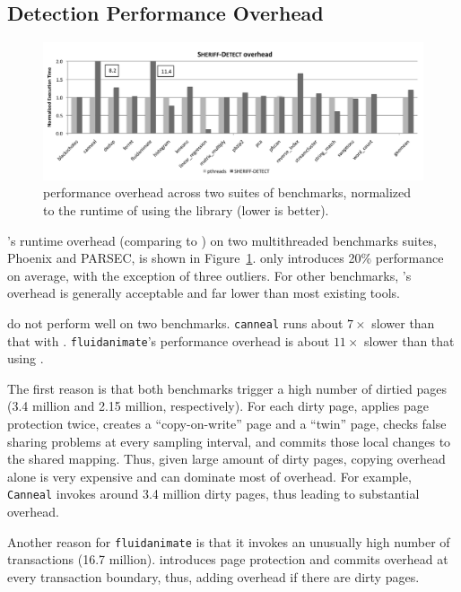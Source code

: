 \subsection{Detection Performance Overhead}
\label{sec:results-runtime-overhead}

\begin{figure}[!t]
\centering
\includegraphics[width=6in]{sheriff/figure/detectiveperf.pdf}
\caption{\sheriffdetect{} performance overhead across two suites of benchmarks, normalized to the runtime of using the \pthreads{} library (lower is better). \label{fig:overhead}}
\end{figure}


\SheriffDetect{}'s  runtime overhead (comparing to \pthreads{}) on two multithreaded benchmarks suites, Phoenix and PARSEC, is shown in Figure~\ref{fig:overhead}.  \SheriffDetect{} only introduces 20\% performance on average, with the exception of three outliers. For other benchmarks, \SheriffDetect{}’s overhead is generally acceptable and far lower than most existing tools.


\sheriffdetect{} do not perform well on two benchmarks. \texttt{canneal} runs about $7\times$ slower than that with \pthreads{}.  \texttt{fluidanimate}'s  performance overhead is about $11\times$ slower than that using \pthreads{}.

The first reason is that both benchmarks
trigger a high number of dirtied pages (3.4 million and
2.15 million, respectively). For each dirty page, \sheriffdetect{} applies page protection twice, creates a ``copy-on-write'' page and a ``twin'' page, checks false sharing problems at every sampling interval, and commits those local changes to the shared mapping. Thus, given large amount of dirty pages, copying overhead alone is very expensive and can dominate most of overhead. For example, \texttt{Canneal} invokes around 3.4 million dirty pages, thus leading to substantial overhead. 

Another reason for \texttt{fluidanimate} is that it invokes an unusually high number of transactions (16.7 million).  \SheriffDetect{} introduces page protection and commits overhead at every transaction boundary, thus, adding overhead if there are dirty pages.
 
